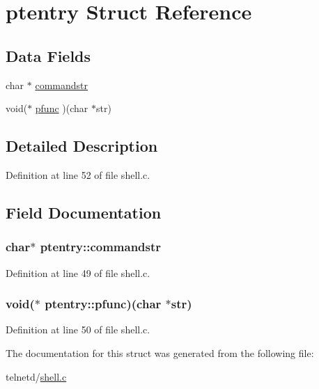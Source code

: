 \hypertarget{structptentry}{
\section{ptentry Struct Reference}
\label{structptentry}
}
\subsection*{Data Fields}
\begin{DoxyCompactItemize}
\item 
char $\ast$ \hyperlink{structptentry_a33aa570217eed7401ef44240e521e4c7}{commandstr}
\item 
void($\ast$ \hyperlink{structptentry_a5b944fd131b5b4739236990a5784c8d1}{pfunc} )(char $\ast$str)
\end{DoxyCompactItemize}


\subsection{Detailed Description}


Definition at line 52 of file shell.c.



\subsection{Field Documentation}
\hypertarget{structptentry_a33aa570217eed7401ef44240e521e4c7}{
\subsubsection[{commandstr}]{\setlength{\rightskip}{0pt plus 5cm}char$\ast$ {\bf ptentry::commandstr}}}
\label{structptentry_a33aa570217eed7401ef44240e521e4c7}


Definition at line 49 of file shell.c.

\hypertarget{structptentry_a5b944fd131b5b4739236990a5784c8d1}{
\subsubsection[{pfunc}]{\setlength{\rightskip}{0pt plus 5cm}void($\ast$  {\bf ptentry::pfunc})(char $\ast$str)}}
\label{structptentry_a5b944fd131b5b4739236990a5784c8d1}


Definition at line 50 of file shell.c.



The documentation for this struct was generated from the following file:\begin{DoxyCompactItemize}
\item 
telnetd/\hyperlink{shell_8c}{shell.c}\end{DoxyCompactItemize}
